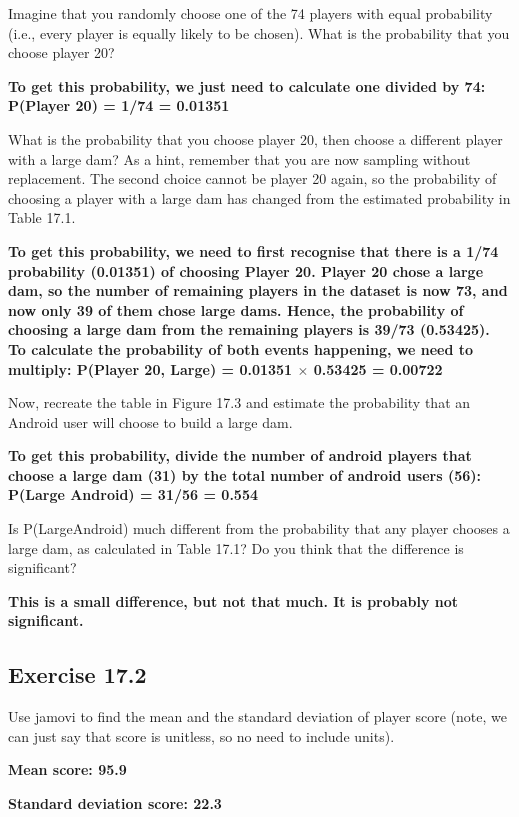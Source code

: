 \documentclass[
  openany]{scrbook}
\begin{document}
Imagine that you randomly choose one of the 74 players with equal probability (i.e., every player is equally likely to be chosen). What is the probability that you choose player 20?

\textbf{To get this probability, we just need to calculate one divided by 74: P(Player 20) = 1/74 = 0.01351}

What is the probability that you choose player 20, then choose a different player with a large dam? As a hint, remember that you are now sampling without replacement. The second choice cannot be player 20 again, so the probability of choosing a player with a large dam has changed from the estimated probability in Table 17.1.

\textbf{To get this probability, we need to first recognise that there is a 1/74 probability (0.01351) of choosing Player 20. Player 20 chose a large dam, so the number of remaining players in the dataset is now 73, and now only 39 of them chose large dams. Hence, the probability of choosing a large dam from the remaining players is 39/73 (0.53425). To calculate the probability of both events happening, we need to multiply: P(Player 20, Large) = 0.01351 \(\times\) 0.53425 = 0.00722}

Now, recreate the table in Figure 17.3 and estimate the probability that an Android user will choose to build a large dam.

\textbf{To get this probability, divide the number of android players that choose a large dam (31) by the total number of android users (56): P(Large \textbar{} Android) = 31/56 = 0.554}

Is P(Large\textbar Android) much different from the probability that any player chooses a large dam, as calculated in Table 17.1? Do you think that the difference is significant?

\textbf{This is a small difference, but not that much. It is probably not significant.}

\hypertarget{exercise-17.2}{%
\subsection{Exercise 17.2}\label{exercise-17.2}}

Use jamovi to find the mean and the standard deviation of player score (note, we can just say that score is unitless, so no need to include units).

\textbf{Mean score: 95.9}

\textbf{Standard deviation score: 22.3}
\end{document}
